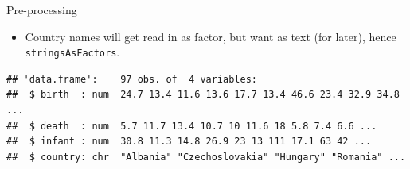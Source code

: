 \begin{frame}[fragile]{Pre-processing}

  \begin{itemize}
  \item Country names will get read in as factor, but want as text (for
    later), hence \texttt{stringsAsFactors}.
  \end{itemize}
  
{\scriptsize
\begin{knitrout}
\color{fgcolor}\begin{kframe}
\begin{alltt}
\hlkwb{=}\hlstd{(}\hlstd{,}
\end{alltt}
\begin{verbatim}
## 'data.frame':	97 obs. of  4 variables:
##  $ birth  : num  24.7 13.4 11.6 13.6 17.7 13.4 46.6 23.4 32.9 34.8 ...
##  $ death  : num  5.7 11.7 13.4 10.7 10 11.6 18 5.8 7.4 6.6 ...
##  $ infant : num  30.8 11.3 14.8 26.9 23 13 111 17.1 63 42 ...
##  $ country: chr  "Albania" "Czechoslovakia" "Hungary" "Romania" ...
\end{verbatim}
\end{kframe}
\end{knitrout}
}
\end{frame}

